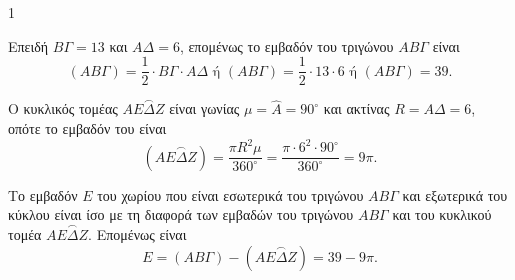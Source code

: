 \begin{ylh}{1}
    \item [Ύλη από εικόνα]
\end{ylh}
\begin{alist}
\item Επειδή $ΒΓ = 13$ και $ΑΔ = 6$, επομένως το εμβαδόν του τριγώνου $ΑΒΓ$ είναι
\[
(ΑΒΓ) = \frac{1}{2} \cdot ΒΓ \cdot ΑΔ \text{ ή } (ΑΒΓ) = \frac{1}{2} \cdot 13 \cdot 6 \text{ ή } (ΑΒΓ) = 39.
\]

\item
\begin{rlist}
\item Ο κυκλικός τομέας $Α\overset{\frown}{ΕΔΖ}$ είναι γωνίας $\mu = \hat{Α} = 90^\circ$ και ακτίνας $R = ΑΔ = 6$, οπότε το εμβαδόν του είναι
\[
(Α\overset{\frown}{ΕΔΖ}) = \frac{\pi R^2 \mu}{360^\circ} = \frac{\pi \cdot 6^2 \cdot 90^\circ}{360^\circ} = 9\pi.
\]
\item Το εμβαδόν $E$ του χωρίου που είναι εσωτερικά του τριγώνου $ΑΒΓ$ και εξωτερικά του κύκλου είναι ίσο με τη διαφορά των εμβαδών του τριγώνου $ΑΒΓ$ και του κυκλικού τομέα $Α\overset{\frown}{ΕΔΖ}$. Επομένως είναι
\[
E = (ΑΒΓ) - (Α\overset{\frown}{ΕΔΖ}) = 39 - 9\pi.
\]
\end{rlist}
\end{alist}